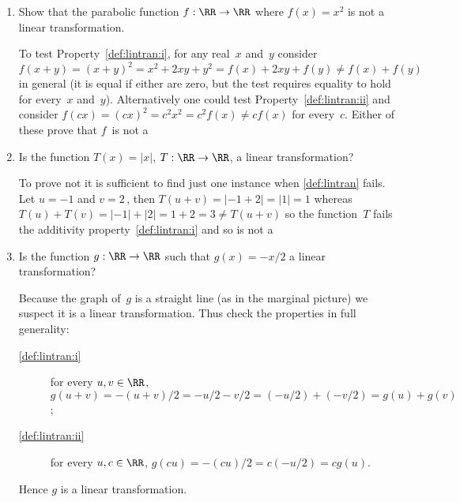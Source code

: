 \begin{example}[1D cases] 
\begin{enumerate}
\item Show that the parabolic function \(f:\RR\to\RR\) where \(f(x)=x^2\) is not a linear transformation.
\begin{solution} 
To test Property~\ref{def:lintran:i},  for any real~\(x\) and~\(y\) consider \(f(x+y)=(x+y)^2=x^2+2xy+y^2=f(x)+2xy+f(y)\neq f(x)+f(y)\) in general (it is equal if either are zero, but the test requires equality to hold for every~\(x\) and~\(y\)).  
Alternatively one could test Property~\ref{def:lintran:ii} and consider \(f(cx)=(cx)^2=c^2x^2=c^2f(x)\neq cf(x)\) for every~\(c\).
Either of these prove that \(f\)~is not a 
\end{solution}

\item Is the function \(T(x)=|x|\), \(T:\RR\to\RR\), a linear transformation? 
\begin{solution} 
To prove not it is sufficient to find just one instance when \cref{def:lintran} fails. 
Let \(u=-1\) and \(v=2\)\,, then \(T(u+v)=|-1+2|=|1|=1\) whereas \(T(u)+T(v)=|-1|+|2|=1+2=3\neq T(u+v)\) so the function~\(T\) fails the additivity property~\cref{def:lintran:i} and so is not a 
\end{solution}

\item Is the function \(g:\RR\to\RR\) such that \(g(x)=-x/2\) a linear transformation?
\begin{solution} 
Because the graph of~\(g\) is a straight line (as in the marginal picture) we suspect it is a linear transformation.
Thus check the properties in full generality:
\begin{description}
\item[\cref{def:lintran:i}] for every \(u,v\in\RR\), \(g(u+v)=-(u+v)/2=-u/2-v/2=(-u/2)+(-v/2)=g(u)+g(v)\);
\item[\cref{def:lintran:ii}] for every \(u,c\in\RR\), \(g(cu)=-(cu)/2=c(-u/2)=cg(u)\).
\end{description}
Hence \(g\) is a linear transformation.
\end{solution}


\end{enumerate}
\end{example}
